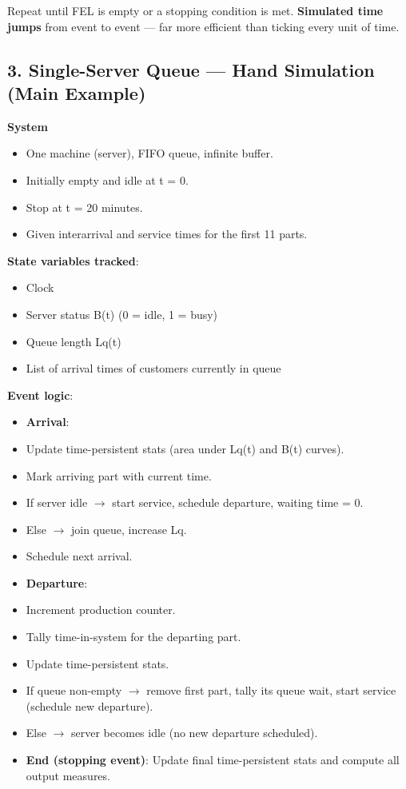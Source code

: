 \documentclass[11pt]{article}
\begin{document}
Repeat until FEL is empty or a stopping condition is met.  
\textbf{Simulated time jumps} from event to event --- far more efficient than ticking every unit of time.

\subsection*{3. Single-Server Queue --- Hand Simulation (Main Example)}
\textbf{System}
\begin{itemize}[leftmargin=*]
\item One machine (server), FIFO queue, infinite buffer.  
\item Initially empty and idle at t = 0.  
\item Stop at t = 20 minutes.  
\item Given interarrival and service times for the first 11 parts.
\end{itemize}

\textbf{State variables tracked}:
\begin{itemize}[leftmargin=*]
\item Clock  
\item Server status B(t) (0 = idle, 1 = busy)  
\item Queue length Lq(t)  
\item List of arrival times of customers currently in queue  
\end{itemize}

\textbf{Event logic}:
\begin{itemize}[leftmargin=*]
\item \textbf{Arrival}:  
\item Update time-persistent stats (area under Lq(t) and B(t) curves).  
\item Mark arriving part with current time.  
\item If server idle $\rightarrow$ start service, schedule departure, waiting time = 0.  
\item Else $\rightarrow$ join queue, increase Lq.  
\item Schedule next arrival.  
\item \textbf{Departure}:  
\item Increment production counter.  
\item Tally time-in-system for the departing part.  
\item Update time-persistent stats.  
\item If queue non-empty $\rightarrow$ remove first part, tally its queue wait, start service (schedule new departure).  
\item Else $\rightarrow$ server becomes idle (no new departure scheduled).  
\item \textbf{End (stopping event)}: Update final time-persistent stats and compute all output measures.
\end{itemize}
\end{document}
